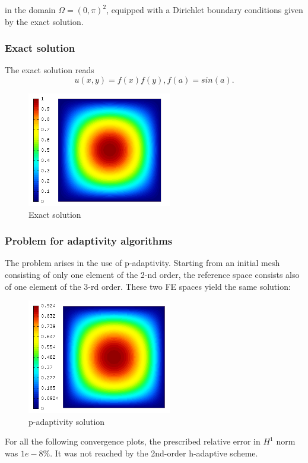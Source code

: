 		in the domain $\Omega = (0, \pi)^2$, equipped with a Dirichlet
		boundary conditions given by the exact solution.

		\subsubsection{Exact solution}
		The exact solution reads
		\begin{equation}
			u(x, y) = f(x) f(y), f(a) = sin(a).
		\end{equation}
		\begin{figure}[H]
			\centering
			\includegraphics[height=5cm]{img/exact-sin.png}
			\caption{Exact solution}
			\label{fig:exact-sin}
		\end{figure}

		\subsubsection{Problem for adaptivity algorithms}
			The problem arises in the use of p-adaptivity. Starting from an initial mesh consisting of only one element of the 2-nd order, the reference space consists also of one element of the 3-rd order. These two FE spaces yield the same solution:
			\begin{figure}[H]
				\centering
				\includegraphics[height=5cm]{img/sin-p.png}
				\caption{p-adaptivity solution}
				\label{fig:exact-sin}
			\end{figure}
			
			For all the following convergence plots, the prescribed relative error in $H^1$ norm was $1e-8\%$. It was not reached by the 2nd-order h-adaptive scheme.
		
